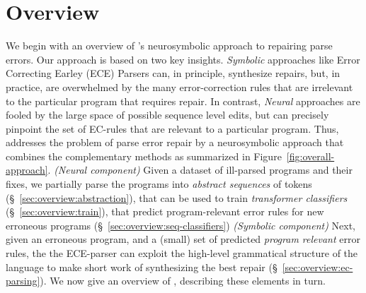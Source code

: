 \section{Overview}
\label{sec:overview}

We begin with an overview of \toolname's neurosymbolic
approach to repairing parse errors.
%
Our approach is based on two key insights.
%
\emph{Symbolic} approaches like Error Correcting
Earley (ECE) Parsers \citep{Aho_1972} can, in principle,
synthesize repairs, but, in practice, are overwhelmed by
the many error-correction rules that are irrelevant to the
particular program that requires repair.
%
In contrast, \emph{Neural} approaches are fooled by the large space of possible
sequence level edits, but can precisely pinpoint the set of EC-rules that are
relevant to a particular program.
%
Thus, \toolname addresses the problem of parse
error repair by a neurosymbolic approach that
combines the complementary methods as summarized
in Figure~\ref{fig:overall-approach}.
%
%
\emph{(Neural component)}
%
Given a dataset of ill-parsed programs and
their fixes, we partially parse the programs
into \emph{abstract sequences} of tokens
(\S~\ref{sec:overview:abstraction}), that can
be used to train \emph{transformer classifiers}
(\S~\ref{sec:overview:train}), that predict
program-relevant error rules for new erroneous
programs (\S~\ref{sec:overview:seq-classifiers})
%
\emph{(Symbolic component)}
%
Next, given an erroneous program, and a (small) set of
predicted \emph{program relevant} error rules, the
the ECE-parser can exploit the high-level grammatical
structure of the language to make short work of
synthesizing the best repair (\S~\ref{sec:overview:ec-parsing}).
%
We now give an overview of \toolname, describing these elements in turn.





